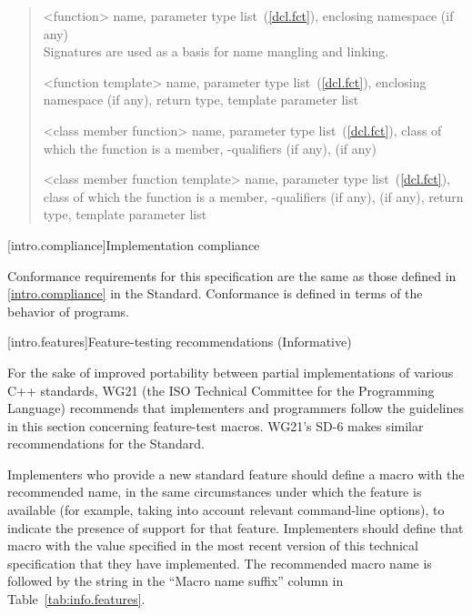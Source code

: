 \begin{quote}
%
<function> name, parameter type list~(\ref{dcl.fct}),  enclosing 
namespace (if any)\\
\enternote Signatures are used as a basis for
name mangling and linking.\exitnote

%
<function template> name, parameter type list~(\ref{dcl.fct}), enclosing namespace (if any),
return type,  template parameter list

%
<class member function> name, parameter type list~(\ref{dcl.fct}), class of which the
function is a member, \cv-qualifiers (if any),
  (if any)

%
<class member function template> name, parameter type list~(\ref{dcl.fct}), class of which the
function is a member, \cv-qualifiers (if any),
 (if any), return type,  template 
parameter list
\end{quote}

[intro.compliance]{Implementation compliance}

\pnum
Conformance requirements for this specification are the same as those 
defined in \ref{intro.compliance} in the \Cpp Standard.
\enternote 
Conformance is defined in terms of the behavior of programs.
\exitnote

[intro.features]{Feature-testing recommendations (Informative)}

For the sake of improved portability between partial implementations of various
C++ standards, WG21 (the ISO Technical Committee for the \Cpp Programming
Language) recommends that implementers and programmers follow the guidelines in
this section concerning feature-test macros. 
\enternote 
WG21's SD-6 makes similar recommendations for the \Cpp Standard.
\exitnote

Implementers who provide a new standard feature should define a macro with the
recommended name, in the same circumstances under which the feature is available
(for example, taking into account relevant command-line options), to indicate
the presence of support for that feature. Implementers should define that macro
with the value specified in the most recent version of this technical
specification that they have implemented. The recommended macro name is
 followed by the string in the ``Macro name suffix''
column in Table~\ref{tab:info.features}.


